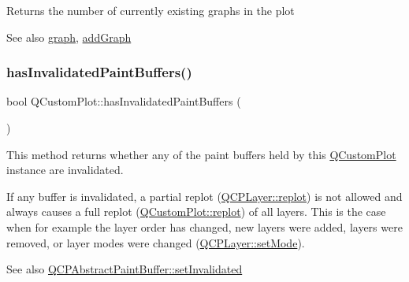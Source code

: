 Returns the number of currently existing graphs in the plot

\begin{DoxySeeAlso}{See also}
\hyperlink{class_q_custom_plot_a6ecae130f684b25276fb47bd3a5875c6}{graph}, \hyperlink{class_q_custom_plot_a6fb2873d35a8a8089842d81a70a54167}{add\+Graph} 
\end{DoxySeeAlso}
\mbox{\label{class_q_custom_plot_ad452b582348c8e99462d83fe1cd0279b}} 
\subsubsection{\texorpdfstring{has\+Invalidated\+Paint\+Buffers()}{hasInvalidatedPaintBuffers()}}
{\footnotesize\ttfamily bool Q\+Custom\+Plot\+::has\+Invalidated\+Paint\+Buffers (\begin{DoxyParamCaption}{ }\end{DoxyParamCaption})\hspace{0.3cm}{\ttfamily [protected]}}

This method returns whether any of the paint buffers held by this \hyperlink{class_q_custom_plot}{Q\+Custom\+Plot} instance are invalidated.

If any buffer is invalidated, a partial replot (\hyperlink{class_q_c_p_layer_adefd53b6db02f470151c416f42e37180}{Q\+C\+P\+Layer\+::replot}) is not allowed and always causes a full replot (\hyperlink{class_q_custom_plot_aa4bfe7d70dbe67e81d877819b75ab9af}{Q\+Custom\+Plot\+::replot}) of all layers. This is the case when for example the layer order has changed, new layers were added, layers were removed, or layer modes were changed (\hyperlink{class_q_c_p_layer_a938d57b04f4e4c23cedf1711f983919b}{Q\+C\+P\+Layer\+::set\+Mode}).

\begin{DoxySeeAlso}{See also}
\hyperlink{class_q_c_p_abstract_paint_buffer_ae4c7dc70dfc66be2879ce297b2b3d67f}{Q\+C\+P\+Abstract\+Paint\+Buffer\+::set\+Invalidated} 
\end{DoxySeeAlso}
\mbox{\label{class_q_custom_plot_af0b57f35646079f93fa6161a65b36109}} 
